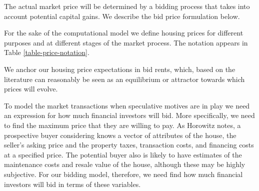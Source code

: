 The actual market price will be determined by a bidding process that takes into account potential capital gains.  We describe the bid price formulation below. %

For the sake of the computational model we define housing prices for different purposes and at different stages of the market process. The notation appears in Table \ref{table-price-notation}.





We anchor our housing price expectations in bid rents, which, based on the literature can reasonably be seen as an equilibrium or attractor towards which prices will evolve. 

To model the market transactions when speculative motives are in play we need an expression for how much financial investors will bid. More specifically, we need to find the maximum price that they are willing to pay. As Horowitz \cite{horowitzBiddingModelsHousing1986} notes, a prospective buyer  considering knows a vector of attributes of the house, the seller’s asking price and the property taxes, transaction costs, and financing costs at a specified price. The  potential buyer also is likely to have estimates of the maintenance costs and resale value of the house, although these may be highly subjective. For our bidding model, therefore, we need find how much financial investors will bid in terms of these variables.

